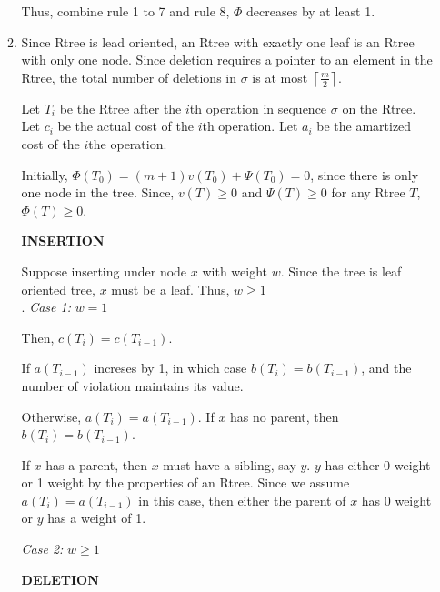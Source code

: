 \documentclass[10pt]{article}
\begin{document}
\begin{enumerate}
\begin{enumerate}
				Thus, combine rule 1 to 7 and rule 8, $\Phi$ decreases by at least 1.
			
			\item %
				Since Rtree is lead oriented, an Rtree with exactly one leaf is an Rtree with only one node.
				Since deletion requires a pointer to an element in the Rtree, the total number of deletions in $\sigma$ is at most $\left\lceil \frac{m}{2} \right\rceil$.
				
				Let $T_i$ be the Rtree after the $i$th operation in sequence $\sigma$ on the Rtree.
				Let $c_i$ be the actual cost of the $i$th operation.
				Let $a_i$ be the amartized cost of the $i$the operation.

				Initially, $\Phi(T_0) = (m+1)v(T_0) + \Psi(T_0) = 0$, since there is only one node in the tree.
				Since, $v(T) \geq 0$ and $\Psi(T) \geq 0$ for any Rtree $T$, $\Phi(T) \geq 0$. 

				\textbf{INSERTION}
				\begin{addmargin}
					Suppose inserting under node $x$ with weight $w$. 
					Since the tree is leaf oriented tree, $x$ must be a leaf.
					Thus, $w \geq 1$ \\.
					\textit{Case 1:} $w = 1$
					\begin{addmargin}[1em]{0em}
						Then, $c(T_i) = c(T_{i-1})$.

						If $a(T_{i-1})$ increses by 1, in which case $b(T_i) = b(T_{i-1})$, and the number of violation maintains its value.

						Otherwise, $a(T_i) = a(T_{i-1})$.
						If $x$ has no parent, then $b(T_i) = b (T_{i-1})$.

						If $x$ has a parent, then $x$ must have a sibling, say $y$.
						$y$ has either 0 weight or 1 weight by the properties of an Rtree.
						Since we assume $a(T_i) = a(T_{i-1})$ in this case, then either the parent of $x$ has 0 weight or $y$ has a weight of 1.
					\end{addmargin}
					\textit{Case 2:} $w \geq 1$
					\begin{addmargin}[1em]{0em}
					\end{addmargin}
				\end{addmargin}
				
				\textbf{DELETION}


\end{enumerate}
\end{enumerate}
\end{document}
